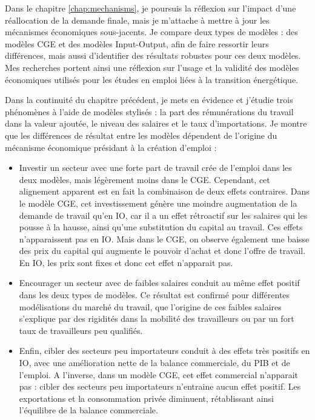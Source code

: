 Dans le chapitre \ref{chap:mechanisms}, je poursuis la réflexion sur l'impact d'une réallocation de la demande finale, mais je m'attache à mettre à jour les mécanismes économiques sous-jacents. Je compare deux types de modèles : des modèles CGE et des modèles Input-Output, afin de faire ressortir leurs différences, mais aussi d'identifier des résultats robustes pour ces deux modèles. Mes recherches portent ainsi une réflexion sur l’usage et la validité des modèles économiques utilisés pour les études en emploi liées à la transition énergétique. 

Dans la continuité du chapitre précédent, je mets en évidence et j’étudie trois phénomènes à l'aide de modèles stylisés : la part des rémunérations du travail dans la valeur ajoutée, le niveau des salaires et le taux d'importations.
Je montre que les différences de résultat entre les modèles dépendent de l'origine du mécanisme économique présidant à la création d'emploi : 
\begin{itemize}
	\item Investir un secteur avec une forte part de travail crée de l'emploi dans les deux modèles, mais légèrement moins dans le CGE. Cependant, cet alignement apparent est en fait la combinaison de deux effets contraires. Dans le modèle CGE, cet investissement génère une moindre augmentation de la demande de travail qu'en IO, car il a un effet rétroactif sur les salaires qui les pousse à la hausse, ainsi qu'une substitution du capital au travail. Ces effets n'apparaissent pas en IO. Mais dans le CGE, on observe également une baisse des prix du capital qui augmente le pouvoir d'achat et donc l'offre de travail. En IO, les prix sont fixes et donc cet effet n'apparait pas.
	\item Encourager un secteur avec de faibles salaires conduit au même effet positif dans les deux types de modèles. Ce résultat est confirmé pour différentes modélisations du marché du travail, que l'origine de ces faibles salaires s'explique par des rigidités dans la mobilité des travailleurs ou par un fort taux de travailleurs peu qualifiés.
	\item Enfin, cibler des secteurs peu importateurs conduit à des effets très positifs en IO, avec une amélioration nette de la balance commerciale, du PIB et de l'emploi. A l'inverse, dans un modèle CGE, cet effet commercial n'apparait pas : cibler des secteurs peu importateurs n'entraine aucun effet positif. Les exportations et la consommation privée diminuent, rétablissant ainsi l'équilibre de la balance commerciale.
\end{itemize}

